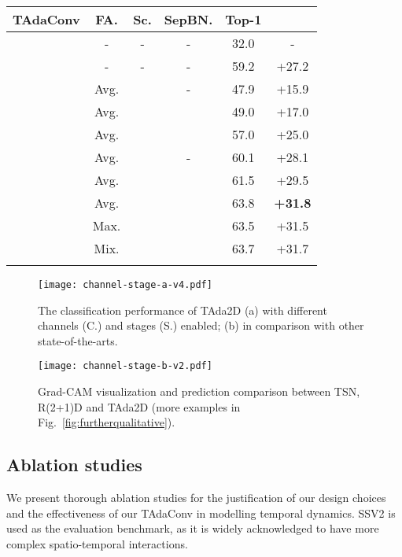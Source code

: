 \documentclass{article} \usepackage{iclr2022_conference,times}
\newcommand{\cmark}{\color{forestgreen}\ding{51}}\newcommand{\xmark}{\color{red}\ding{55}}\usepackage{pifont}
\begin{document}
\begin{table}[]
\begin{minipage}[t]{0.46\textwidth}
\begin{tabular}{cccccc}
\bf TAdaConv & \bf FA. & \bf Sc. &\bf SepBN. & \bf Top-1 & \\
\hline
\xmark & - & - & - & 32.0 & - \\
\cmark & - & - & - & 59.2 & +27.2\\
\hline
\xmark & Avg. & \xmark & - & 47.9 & +15.9 \\
\xmark & Avg. & \cmark & \xmark & 49.0 & +17.0 \\
\xmark & Avg. & \cmark & \cmark & 57.0 & +25.0\\
\hline
\cmark & Avg. & \xmark & - & 60.1 & +28.1 \\
\cmark & Avg. & \cmark & \xmark & 61.5 & +29.5\\
\cmark & Avg. & \cmark & \cmark & 63.8 & \bf +31.8 \\
\hline
\cmark & Max. & \cmark & \cmark & 63.5 & +31.5 \\
\cmark & Mix. & \cmark & \cmark & 63.7 & +31.7\\
\shline
\end{tabular}
\label{tab:featureaggregation}
\end{minipage}
\vspace{-4mm}
\end{table}
\begin{figure}[t]
\centering
\begin{minipage}[t]{0.53\textwidth}
\centering
\texttt{[image: channel-stage-a-v4.pdf]}
\caption{
The classification performance of TAda2D (a) with different channels (C.) and stages (S.) enabled; (b) in comparison with other state-of-the-arts.
}
\label{fig:proportions}
\end{minipage}\hspace{1.5mm}
\begin{minipage}[t]{0.45\textwidth}
\centering
\texttt{[image: channel-stage-b-v2.pdf]}
\caption{
Grad-CAM visualization and prediction comparison between TSN, R(2+1)D and TAda2D (more examples in Fig.~\ref{fig:furtherqualitative}). 
}
\label{fig:visualization}
\end{minipage}
\vspace{-7mm}
\end{figure}
\subsection{Ablation studies}
We present thorough ablation studies for the justification of our design choices and the effectiveness of our TAdaConv in modelling temporal dynamics. SSV2 is used as the evaluation benchmark, as it is widely acknowledged to have more complex spatio-temporal interactions. 
\end{document}
